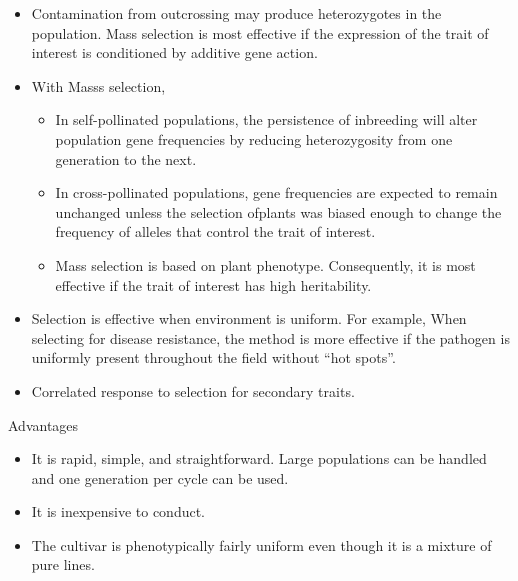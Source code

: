 \documentclass[11pt,ignorenonframetext,aspectratio=169]{beamer}
\providecommand{\tightlist}{%
  \setlength{\itemsep}{0pt}\setlength{\parskip}{0pt}}
\begin{document}
\begin{frame}{}
\protect\hypertarget{section-7}{}
\begin{itemize}
\tightlist
\item
  Contamination from outcrossing may produce heterozygotes in the
  population. Mass selection is most effective if the expression of the
  trait of interest is conditioned by additive gene action.
\item
  With Masss selection,

  \begin{itemize}
  \tightlist
  \item
    In self-pollinated populations, the persistence of inbreeding will
    alter population gene frequencies by reducing heterozygosity from
    one generation to the next.
  \item
    In cross-pollinated populations, gene frequencies are expected to
    remain unchanged unless the selection ofplants was biased enough to
    change the frequency of alleles that control the trait of interest.
  \item
    Mass selection is based on plant phenotype. Consequently, it is most
    effective if the trait of interest has high heritability.
  \end{itemize}
\item
  Selection is effective when environment is uniform. For example, When
  selecting for disease resistance, the method is more effective if the
  pathogen is uniformly present throughout the field without ``hot
  spots''.
\item
  Correlated response to selection for secondary traits.
\end{itemize}
\end{frame}

\begin{frame}{Advantages}
\protect\hypertarget{advantages}{}
\begin{itemize}
\tightlist
\item
  It is rapid, simple, and straightforward. Large populations can be
  handled and one generation per cycle can be used.
\item
  It is inexpensive to conduct.
\item
  The cultivar is phenotypically fairly uniform even though it is a
  mixture of pure lines.
\end{itemize}
\end{frame}
\end{document}
